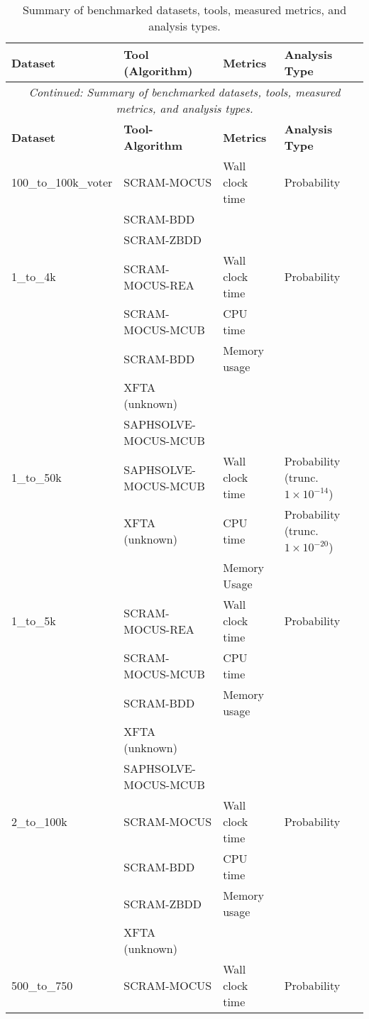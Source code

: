 \begin{longtable}{llll}
\caption{Summary of benchmarked datasets, tools, measured metrics, and analysis types.}
\label{tab:what_was_benchmarked}\\
\toprule
\textbf{Dataset} & \textbf{Tool (Algorithm)} & \textbf{Metrics} & \textbf{Analysis Type} \\
\midrule
\endfirsthead
\multicolumn{4}{c}{\textit{Continued: Summary of benchmarked datasets, tools, measured metrics, and analysis types.}}\\
\toprule
\textbf{Dataset} & \textbf{Tool-Algorithm} & \textbf{Metrics} & \textbf{Analysis Type} \\
\midrule
\endhead
%
\bottomrule
\endfoot
%
\endlastfoot

100\_to\_100k\_voter
    & SCRAM-MOCUS & Wall clock time & Probability \\
    & SCRAM-BDD & & \\
    & SCRAM-ZBDD & & \\
\midrule
1\_to\_4k
    & SCRAM-MOCUS-REA & Wall clock time & Probability \\
    & SCRAM-MOCUS-MCUB & CPU time  &  \\
    & SCRAM-BDD &  Memory usage &  \\
    & XFTA (unknown) &  &  \\
    & SAPHSOLVE-MOCUS-MCUB &  &  \\
\midrule
1\_to\_50k
    & SAPHSOLVE-MOCUS-MCUB & Wall clock time & Probability (trunc. $1 \times 10^{-14}$) \\
    & XFTA (unknown) &  CPU time &  Probability (trunc. $1 \times 10^{-20}$) \\
    &  & Memory Usage & \\
\midrule
1\_to\_5k
    & SCRAM-MOCUS-REA & Wall clock time & Probability \\
    & SCRAM-MOCUS-MCUB & CPU time &  \\
    & SCRAM-BDD & Memory usage &  \\
    & XFTA (unknown) &  &  \\
    & SAPHSOLVE-MOCUS-MCUB &  &  \\
\midrule
2\_to\_100k
    & SCRAM-MOCUS & Wall clock time & Probability \\
    & SCRAM-BDD & CPU time &  \\
    & SCRAM-ZBDD & Memory usage &  \\
    & XFTA (unknown) &  &  \\
\midrule
500\_to\_750
    & SCRAM-MOCUS & Wall clock time & Probability \\

\end{longtable}

